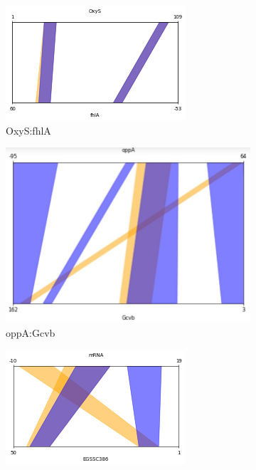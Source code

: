 \documentclass[twoside,a4paper]{report}
\begin{document}
		
	\begin{figure}
		\centering
		\begin{subfigure}{.5\textwidth}
			\centering
			\includegraphics[width=.9\linewidth]{fhla}
			\caption{OxyS:fhlA}
			\label{fig:fhla}
		\end{subfigure}%
		\begin{subfigure}{.5\textwidth}
			\centering
			\includegraphics[width=.9\linewidth]{oppagcvb}
			\caption{oppA:Gcvb}
			\label{fig:oppagcvb}
		\end{subfigure}
		\begin{subfigure}{.5\textwidth}
			\centering
			\includegraphics[width=.9\linewidth]{egs(e)}

\end{subfigure}
\end{figure}
\end{document}
